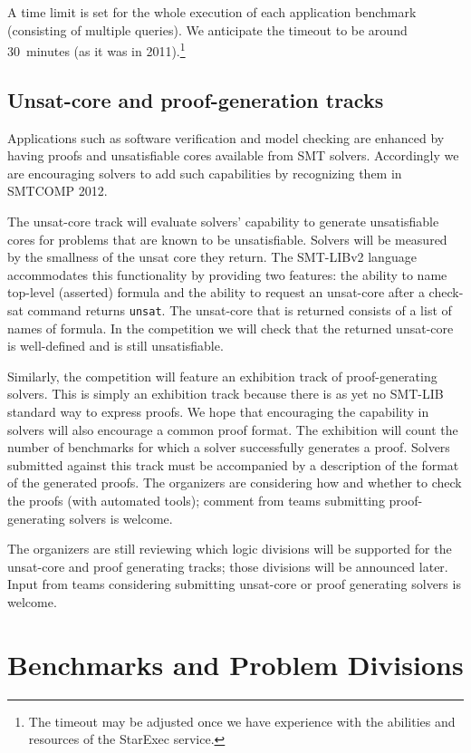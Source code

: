 \documentclass[12pt]{article}
\begin{document}
A time limit is set for the whole execution of each application
benchmark (consisting of multiple queries).  We anticipate the
timeout to be around 30~minutes (as it was in 2011).\footnote{The timeout may be adjusted once we have experience with the abilities and resources of the StarExec service.}


\subsection{Unsat-core and proof-generation tracks}

Applications such as software verification and model checking are enhanced by having
proofs and unsatisfiable cores available from SMT solvers. Accordingly we are 
encouraging solvers to add such capabilities by recognizing them in SMTCOMP 2012.

The unsat-core track will evaluate solvers' capability to generate unsatisfiable cores for
problems that are known to be unsatisfiable. Solvers will be measured by the smallness of
the unsat core they return. The SMT-LIBv2 language accommodates this functionality by 
providing two features: the ability to name top-level (asserted) formula and the ability to
request an unsat-core after a check-sat command returns \texttt{unsat}. The unsat-core that
is returned consists of a list of names of formula. In the competition we will check that the
returned unsat-core is well-defined and is still unsatisfiable.

Similarly, the competition will feature an exhibition track of proof-generating solvers. This is
simply an exhibition track because there is as yet no SMT-LIB standard way to express proofs. We hope
that encouraging the capability in solvers will also encourage a common proof format. The exhibition
will count the number of benchmarks for which a solver successfully generates a proof.
Solvers submitted against this track must be accompanied by a description of the format of the 
generated proofs. The organizers are considering how and whether to check the proofs (with automated tools);
comment from teams submitting proof-generating solvers is welcome. %

The organizers are still reviewing which logic divisions will be supported for the unsat-core and proof generating tracks; 
those divisions will be announced later.
Input from teams considering submitting unsat-core or proof generating solvers is welcome.

\section{Benchmarks and Problem Divisions}
\label{sec:theories}
\end{document}
